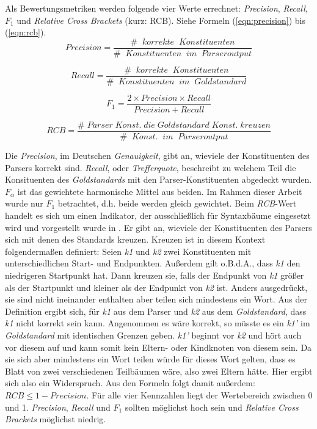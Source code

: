 Als Bewertungsmetriken werden folgende vier Werte errechnet: \textit{Precision}, \textit{Recall}, \(F_1\) und \textit{Relative Cross Brackets} (kurz: RCB). Siehe Formeln (\ref{eqn:precision}) bis (\ref{eqn:rcb}). \\ 
\begin{equation}
Precision = \frac{\# \;\; korrekte \;\; Konstituenten}{ \# \;\; Konstituenten \;\; im \;\; Parseroutput}
\label{eqn:precision}
\end{equation}

\begin{equation}
Recall = \frac{\# \;\; korrekte \;\; Konstituenten}{ \# \;\; Konstituenten \;\; im \;\; Goldstandard}
\end{equation}

\begin{equation}
F_1 = \frac{2 \times Precision \times Recall}{ Precision + Recall}
\end{equation}

\begin{equation}
RCB = \frac{\# \; Parser \; Konst. \; die \; Goldstandard \; Konst. \; kreuzen}{ \# \;\; Konst. \;\; im \;\; Parseroutput}
\label{eqn:rcb}
\end{equation}

Die \textit{Precision}, im Deutschen \textit{Genauigkeit}, gibt an, wieviele der Konstituenten des Parsers korrekt sind. \textit{Recall}, oder \textit{Trefferquote}, beschreibt zu welchem Teil die Konsituenten des \textit{Goldstandards} mit den Parser-Konstituenten abgedeckt wurden. \(F_\alpha\) ist das gewichtete harmonische Mittel aus beiden. Im Rahmen dieser Arbeit wurde nur \(F_1\) betrachtet, d.h. beide werden gleich gewichtet. Beim \textit{RCB}-Wert handelt es sich um einen Indikator, der ausschließlich für Syntaxbäume eingesetzt wird und vorgestellt wurde in \cite{crossbrackets}. Er gibt an, wieviele der Konstituenten des Parsers sich mit denen des Standards kreuzen. Kreuzen ist in diesem Kontext folgendermaßen definiert: Seien \textit{k1} und \textit{k2} zwei Konstituenten mit unterschiedlichen Start- und Endpunkten. Außerdem gilt o.B.d.A., dass \textit{k1} den niedrigeren Startpunkt hat. Dann kreuzen sie, falls der Endpunkt von \textit{k1} größer als der Startpunkt und kleiner als der Endpunkt von \textit{k2} ist. Anders ausgedrückt, sie sind nicht ineinander enthalten aber teilen sich mindestens ein Wort. %
Aus der Definition ergibt sich, für \textit{k1} aus dem Parser und \textit{k2} aus dem \textit{Goldstandard}, dass \textit{k1} nicht korrekt sein kann. Angenommen es wäre korrekt, so müsste es ein \textit{k1'} im \textit{Goldstandard} mit identischen Grenzen geben. \textit{k1'} beginnt vor \textit{k2} und hört auch vor diesem auf und kann somit kein Eltern- oder Kindknoten von diesem sein. Da sie sich aber mindestens ein Wort teilen würde für dieses Wort gelten, dass es Blatt von zwei verschiedenen Teilbäumen wäre, also zwei Eltern hätte. Hier ergibt sich also ein Widerspruch. Aus den Formeln folgt damit außerdem: \( RCB \leq 1 - Precision \). Für alle vier Kennzahlen liegt der Wertebereich zwischen 0 und 1. \textit{Precision}, \textit{Recall} und \(F_1\) sollten möglichst hoch sein und \textit{Relative Cross Brackets} möglichst niedrig.
